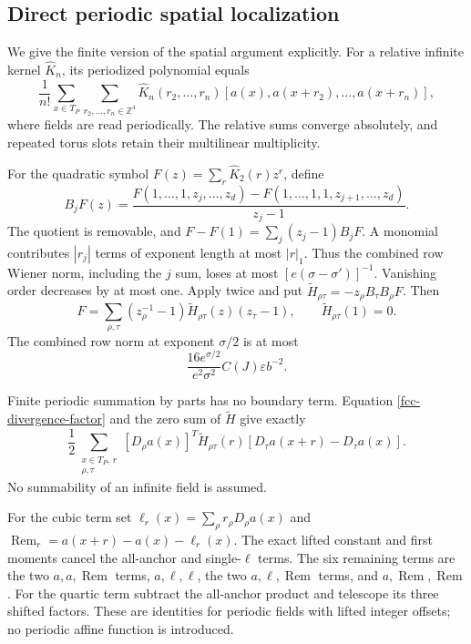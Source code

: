 \documentclass[11pt]{article}
\theoremstyle{remark}
\begin{document}
\subsection{Direct periodic spatial localization}
\label{fcc-periodic-spatial-section}

We give the finite version of the spatial argument explicitly.
For a relative infinite kernel \(\widehat K_n\), its
periodized polynomial equals
\begin{equation}
 \frac1{n!}\sum_{x\in T_P}
  \sum_{r_2,\ldots,r_n\in\mathbb Z^4}
   \widehat K_n(r_2,\ldots,r_n)
       [a(x),a(x+r_2),\ldots,a(x+r_n)],
 \label{fcc-periodic-polynomial}
\end{equation}
where fields are read periodically. The relative sums
converge absolutely, and repeated torus slots retain
their multilinear multiplicity.

For the quadratic symbol \(F(z)=\sum_r\widehat K_2(r)z^r\),
define
\[
 B_jF(z)=
 \frac{F(1,\ldots,1,z_j,\ldots,z_d)
       -F(1,\ldots,1,1,z_{j+1},\ldots,z_d)}{z_j-1}.
\]
The quotient is removable, and
\(F-F(1)=\sum_j(z_j-1)B_jF\). A monomial contributes
\(|r_j|\) terms of exponent length at most \(|r|_1\).
Thus the combined row Wiener norm, including the \(j\)
sum, loses at most \([e(\sigma-\sigma')]^{-1}\).
Vanishing order decreases by at most one. Apply twice
and put \(\widetilde H_{\rho\tau}=-z_\rho B_\tau B_\rho F\).
Then
\begin{equation}
 F=\sum_{\rho,\tau}(z_\rho^{-1}-1)
          \widetilde H_{\rho\tau}(z)(z_\tau-1),
 \qquad \widetilde H_{\rho\tau}(1)=0.
 \label{fcc-divergence-factor}
\end{equation}
The combined row norm at exponent \(\sigma/2\) is at
most
\[
 \frac{16e^{\sigma/2}}{e^2\sigma^2}
                  C(J)\varepsilon b^{-2}.
\]

Finite periodic summation by parts has no boundary term.
Equation \eqref{fcc-divergence-factor} and the zero sum
of \(\widetilde H\) give exactly
\begin{equation}
 \frac12\sum_{\substack{x\in T_P,\,r\\\rho,\tau}}
 [D_\rho a(x)]^T\widetilde H_{\rho\tau}(r)
                [D_\tau a(x+r)-D_\tau a(x)].
 \label{fcc-periodic-ibp}
\end{equation}
No summability of an infinite field is assumed.

For the cubic term set
\(\ell_r(x)=\sum_\rho r_\rho D_\rho a(x)\) and
\(\operatorname{Rem}_r=a(x+r)-a(x)-\ell_r(x)\).
The exact lifted constant and first moments cancel
the all-anchor and single-\(\ell\) terms. The six
remaining terms are the two \(a,a,\operatorname{Rem}\)
terms, \(a,\ell,\ell\), the two
\(a,\ell,\operatorname{Rem}\) terms, and
\(a,\operatorname{Rem},\operatorname{Rem}\).
For the quartic term subtract the all-anchor product
and telescope its three shifted factors. These are
identities for periodic fields with lifted integer
offsets; no periodic affine function is introduced.
\end{document}
